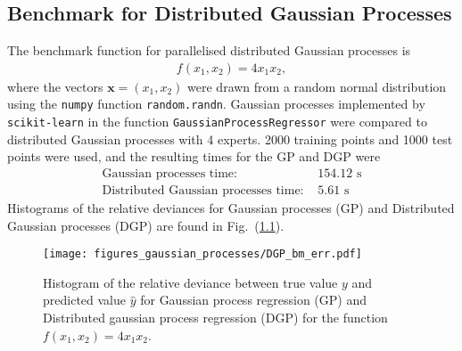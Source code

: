 \documentclass[twoside,english]{uiofysmaster}
\begin{document}
\begin{appendices}
\chapter{Benchmark for Distributed Gaussian Processes}

The benchmark function for parallelised distributed Gaussian processes is
\begin{align*}
f(x_1, x_2) =  4x_1x_2,
\end{align*}
where the vectors $\textbf{x} = (x_1, x_2)$ were drawn from a random normal distribution using the \verb|numpy| function \verb|random.randn|. Gaussian processes implemented by \verb|scikit-learn| in the function \verb|GaussianProcessRegressor| were compared to distributed Gaussian processes with 4 experts. 2000 training points and 1000 test points were used, and the resulting times for the GP and DGP were
\begin{align}
\text{Gaussian processes time: }& 154.12 \text{ s}\\
\text{Distributed Gaussian processes time: }& 5.61 \text{ s}
\end{align}
Histograms of the relative deviances for Gaussian processes (GP) and Distributed Gaussian processes (DGP) are found in Fig.\ (\ref{Fig:: gaussian process : DGP BM error histogram}).

\begin{figure}
\centering
\texttt{[image: figures\_gaussian\_processes/DGP\_bm\_err.pdf]}
\caption{Histogram of the relative deviance between true value $y$ and predicted value $\hat{y}$ for Gaussian process regression (GP) and Distributed gaussian process regression (DGP) for the function $f(x_1,x_2) = 4x_1 x_2$.}
\label{Fig:: gaussian process : DGP BM error histogram}
\end{figure}


\end{appendices}



\end{document}

